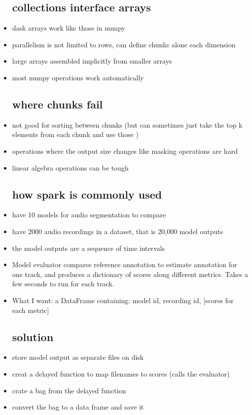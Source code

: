 \documentclass{article}
\begin{document}
\begin{itemize}
\subsection*{collections interface arrays }
\item dask arrays work like those in numpy 
\item parallelism is not limited to rows, can define chunks alone each dimension 
\item large arrays assembled implicitly from smaller arrays 
\item most numpy operations work automatically
\subsection*{where chunks fail}
\item not good for sorting between chunks (but can sometimes just take the top k elements from each chunk and use those )
\item operations where the output size changes like masking operations are hard 
\item linear algebra operations can be tough 


\subsection*{how spark is commonly used }
\item have 10 models for audio segmentation to compare 
\item have 2000 audio recordings in a dataset, that is 20,000 model outputs
\item the model outputs are a sequence of time intervals 
\item  Model evaluator compares reference annotation to estimate annotation for one track, and produces
a dictionary of scores along different metrics. Takes a few seconds to run for each track.
\item What I want: a DataFrame containing:
model id, recording id, [scores for each metric]
\subsection*{solution}
\item store model output as separate files on disk 
\item creat a delayed function to map filenames to scores (calls the evaluator)
\item crate a bag from the delayed function
\item convert the bag to a data frame and save it 

\end{itemize}
\end{document}
